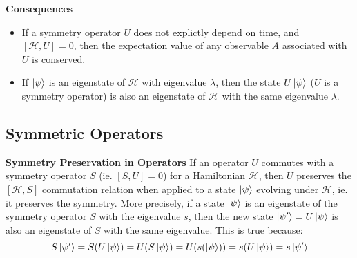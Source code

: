 \documentclass{article}
\newcommand{\ham}{\mathcal{H}}
\begin{document}
\textbf{Consequences}
\begin{itemize}
	\item If a symmetry operator $U$ does not explictly depend on time, and $[\ham, U] = 0$, then the expectation value of any observable $A$ associated with $U$ is conserved.
	\item If $\ket{\psi}$ is an eigenstate of $\ham$ with eigenvalue $\lambda$, then the state $U\ket{\psi}$ ($U$ is a symmetry operator) is also an eigenstate of $\ham$ with the same eigenvalue $\lambda$.
\end{itemize}

\subsection{Symmetric Operators}
	
\textbf{Symmetry Preservation in Operators}
If an operator $U$ commutes with a symmetry operator $S$ (ie. $[S, U] = 0$) for a Hamiltonian $\ham$, then $U$ preserves the $[\ham, S]$ commutation relation when applied to a state $\ket{\psi}$ evolving under $\ham$, ie. it preserves the symmetry. More precisely, if a state $\ket{\psi}$ is an eigenstate of the symmetry operator $S$ with the eigenvalue $s$, then the new state $\ket{\psi'} = U\ket{\psi}$ is also an eigenstate of $S$ with the same eigenvalue. This is true because: $$S\ket{\psi'} = S(U\ket{\psi}) = U(S\ket{\psi}) = U(s(\ket{\psi})) = s(U\ket{\psi}) = s\ket{\psi'}$$
\vspace{0.1ex}
	
\end{document}
